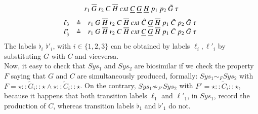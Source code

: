 {\[\begin{array}{lcl@{\hspace{0.3cm}} lcl}
r_1~\overline{G}~r_2~C~\overline{H}~cxt~\underline{C}~\underline{G}~\underline{H}~p_1~p_2~\tilde{G}~\silent
\end{array}
\]
\[
\begin{array}{lcl @{\hspace{0.3cm}}lcl}
\ell_3 & \defeq & 
r_1~G~\overline{H}~r_2~C~\overline{H}~cxt~\hat{C}~\underline{G}~\overline{H}~p_1~\tilde{C}~p_2~\tilde{G}~\silent
\\
\ell'_3 & \defeq & r_1~G~\overline{H}~r_2~C~\overline{H}~cxt~\underline{C}~\underline{G}~\overline{H}~p_1~\tilde{C}~p_2~\tilde{G}~\silent
\end{array}
\]
}
The labels $\flat_i$ $\flat'_i$, with $i \in \{1,2,3\}$ can be obtained by labels $\ell_i,\ell'_i$ by substituting $G$ with $C$ and viceversa.
\\
Now, it easy to check that $Sys_1$ and $Sys_2$ are biosimilar if we check the property $F$ saying that $G$ and $C$ are simultaneously  produced,
formally:
$Sys_1 \sim_F Sys_2$ with $F= \star :: \tilde{G}_i :: \star \wedge  \star :: \tilde{C}_i :: \star $.
On the contrary, $Sys_1 \not \sim_{F'} Sys_2$  with $F' =  \star :: \tilde{C}_i :: \star $, 
because it happens that both  transition labels $\ell_1$  and $\ell'_1$, in $Sys_1$, record the production of $C$, whereas 
transition labels $\flat_1$ and $\flat'_1$ do not.
